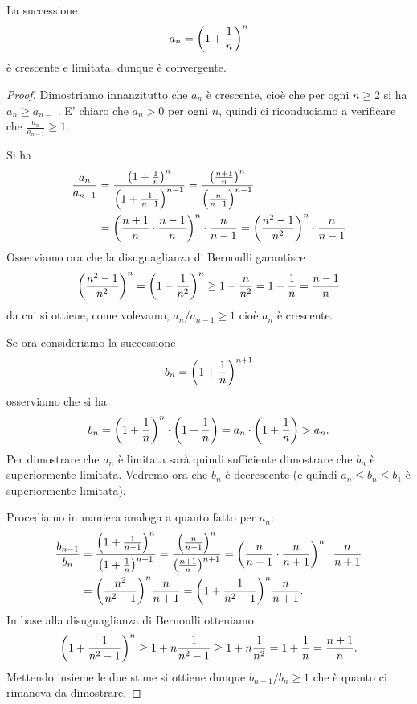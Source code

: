 \begin{theorem}
\mymark{**}
La successione
\[
  a_n = {\left( 1+\frac 1 n \right)}^n
\]
è crescente e limitata, dunque è convergente.
\end{theorem}
%
\begin{proof}
Dimostriamo innanzitutto che $a_n$ è crescente, cioè che
per ogni $n\ge 2$ si ha $a_n \ge a_{n-1}$.
E' chiaro che $a_n>0$ per ogni $n$,
quindi ci riconduciamo a
verificare che $\frac{a_n}{a_{n-1}} \ge 1$.

Si ha
\begin{align*}
\frac{a_n}{a_{n-1}}
&= \frac{{\left( 1+\frac 1 n \right)}^n}{{\left( 1+\frac 1 {n-1} \right)}^{n-1}}
= \frac{{\left( \frac{n+1}{n} \right)}^n}{{\left( \frac{n}{n-1} \right)}^{n-1}}\\
&= {\left( \frac{n+1}{n}\cdot\frac{n-1}{n} \right)}^n \cdot \frac{n}{n-1}
= {\left( \frac{n^2- 1}{n^2} \right)}^n \cdot \frac{n}{n-1}
\end{align*}
Osserviamo ora che la disuguaglianza di Bernoulli garantisce
\[
  {\left( \frac{n^2 -1}{n^2} \right)}^n
  = {\left( 1-\frac{1}{n^2} \right)}^n
  \ge 1 - \frac{n}{n^2} = 1 - \frac{1}{n} = \frac{n-1}{n}
\]
da cui si ottiene, come volevamo, $a_n / a_{n-1} \ge 1$ cioè
$a_n$ è crescente.

Se ora consideriamo la successione
\[
  b_n = {\left( 1+\frac 1 n \right)}^{n+1}
\]
osserviamo che si ha
\[
  b_n = {\left( 1+\frac 1 n \right)}^n \cdot {\left( 1+\frac 1 n \right)}
   = a_n\cdot {\left( 1+\frac 1 n \right)} > a_n.
\]
Per dimostrare che $a_n$ è limitata sarà quindi sufficiente dimostrare
che $b_n$ è superiormente limitata. Vedremo ora che $b_n$ è decrescente (e quindi $a_n \le b_n \le b_1$ è superiormente limitata).

Procediamo in maniera analoga a quanto fatto per $a_n$:
\begin{align*}
\frac{b_{n-1}}{b_n}
& = \frac{{\left( 1+\frac{1}{n-1} \right)}^n}{{\left( 1+\frac{1}{n} \right)}^{n+1}}
  = \frac{{\left( \frac{n}{n-1} \right)}^n}{{\left( \frac{n+1}{n} \right)}^{n+1}}
  = {\left( \frac{n}{n-1}\cdot\frac{n}{n+1} \right)}^n\cdot\frac{n}{n+1} \\
& = {\left( \frac{n^2}{n^2-1} \right)}^n \frac{n}{n+1}
  = {\left( 1 + \frac{1}{n^2-1} \right)}^n \frac{n}{n+1}.
\end{align*}
In base alla disuguaglianza di Bernoulli otteniamo
\[
  {\left( 1 + \frac{1}{n^2-1} \right)}^n
  \ge 1 + n \frac{1}{n^2-1}
  \ge 1 + n\frac{1}{n^2}  = 1+\frac{1}{n} = \frac{n+1}{n}.
\]
Mettendo insieme le due stime si ottiene dunque $b_{n-1}/b_n \ge 1$
che è quanto ci rimaneva da dimostrare.
\end{proof}

